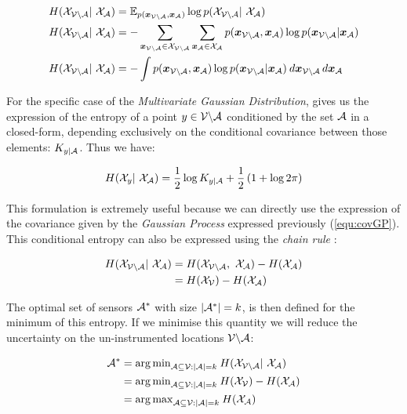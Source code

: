 \begin{align}
    H(\X_{\VA} | \X_\A) &= \mathbb{E}_{p(\vec{x}_{\VA},\vec{x}_\A)} \log p(\X_{\VA} | \X_\A) \\
    H(\X_{\VA} | \X_\A) &= - \sum_{\vec{x}_{\VA} \in \X_{\VA}}\sum_{\vec{x}_{\A} \in \X_{\A}} p(\vec{x}_{\VA},\vec{x}_\A) \log p(\vec{x}_{\VA}|\vec{x}_\A) \\
    H(\X_{\VA} | \X_\A) &= - \int p(\vec{x}_{\VA},\vec{x}_\A) \log p(\vec{x}_{\VA}|\vec{x}_\A) \: d\vec{x}_{\VA} \, d\vec{x}_\A 
\end{align}

For the specific case of the \textit{Multivariate Gaussian Distribution}, \citet{krause_near-optimal_2008} gives us the expression of the entropy of a point $y \in \mathcal{V} \backslash\mathcal{A}$ conditioned by the set $\mathcal{A}$ in a closed-form, depending exclusively on the conditional covariance between those elements: $K_{y | \mathcal{A}}$. Thus we have:  

\begin{equation}
    H(\X_{y} | \X_\A) = \frac{1}{2} \log K_{y | \A} + \frac{1}{2} \left(1 + \log 2\pi  \right) \label{equ:entGP}
\end{equation}

This formulation is extremely useful because we can directly use the expression of the covariance given by the \textit{Gaussian Process} expressed previously (\ref{equ:covGP}). \\


This conditional entropy can also be expressed using the \textit{chain rule}  \citep[p.~16]{cover_elements_1991}: 

\begin{align}
    H(\X_{\VA} | \X_\A) &= H(\X_{\VA} ,  \X_\A) -  H(\X_{\A}) \\
    &= H(\X_{\V}) -  H(\X_{\A}) 
\label{equ:chainentropy}
\end{align}

The optimal set of sensors $\mathcal{A}^*$ with size $|\mathcal{A}^*| = k$, is then defined for the minimum of this entropy. If we minimise this quantity we will reduce the uncertainty on the un-instrumented locations $\mathcal{V} \backslash\mathcal{A}$: 

\begin{align}
    \A^* &= {\arg\min}_{\A \subseteq \V: |\A| = k } \: H(\X_{\VA} | \X_\A) \\
     &= {\arg\min}_{\A \subseteq \V: |\A| = k }\:  H(\X_\V) -  H(\X_{\A}) \\
     &= {\arg\max}_{\A \subseteq \V: |\A| = k }\:  H(\X_{\A}) 
\end{align}


